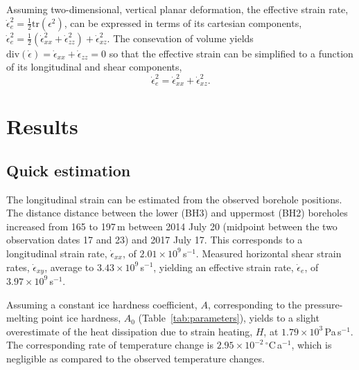\documentclass[utf8]{article}
\begin{document}
    Assuming two-dimensional, vertical planar deformation, the effective strain
    rate, $\dot\epsilon_e^2 = \frac{1}{2}\mathrm{tr}(\epsilon^2)$, can be
    expressed in terms of its cartesian components, $\dot\epsilon_e^2 =
    \frac{1}{2}(\dot\epsilon_{xx}^2 + \dot\epsilon_{zz}^2) +
    \dot\epsilon_{xz}^2$. The consevation of volume yields
    $\mathrm{div}(\dot\epsilon) = \dot\epsilon_{xx} + \dot\epsilon_{zz} = 0$ so
    that the effective strain can be simplified to a function of its
    longitudinal and shear components,
    \begin{equation}
        \dot\epsilon_e^2 = \dot\epsilon_{xx}^2 + \dot\epsilon_{xz}^2.
    \end{equation}


\section{Results}

\subsection{Quick estimation}

    The longitudinal strain can be estimated from the observed borehole
    positions. The distance distance between the lower (BH3) and uppermost
    (BH2) boreholes increased from 165 to 197\,m between 2014 July 20 (midpoint
    between the two observation dates 17 and 23) and 2017 July 17. This
    corresponds to a longitudinal strain rate, $\dot\epsilon_{xx}$, of
    $2.01\times10^9$\,s$^{-1}$. Measured horizontal shear strain rates,
    $\dot\epsilon_{xy}$, average to $3.43\times10^9$\,s$^{-1}$, yielding
    an effective strain rate, $\dot\epsilon_e$, of $3.97\times10^9$\,s$^{-1}$.

    Assuming a constant ice hardness coefficient, $A$, corresponding to the
    pressure-melting point ice hardness, $A_0$ (Table~\ref{tab:parameters}),
    yields to a slight overestimate of the heat dissipation due to strain
    heating, $H$, at $1.79\times10^3$\,Pa\,s$^{-1}$. The corresponding
    rate of temperature change is $2.95\times10^{-2}$\,$^{\circ}$C\,a$^{-1}$,
    which is negligible as compared to the observed temperature changes.
\end{document}
